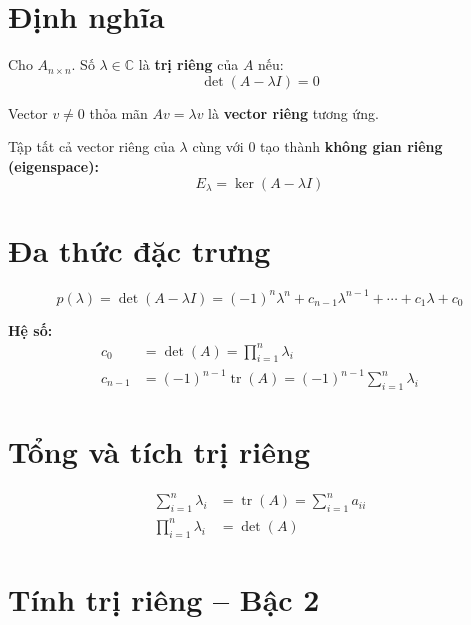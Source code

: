 
\section{Định nghĩa}

Cho $A_{n \times n}$. Số $\lambda \in \mathbb{C}$ là \textbf{trị riêng} của $A$ nếu:
\[
\det(A - \lambda I) = 0
\]

Vector $v \neq 0$ thỏa mãn $Av = \lambda v$ là \textbf{vector riêng} tương ứng.

Tập tất cả vector riêng của $\lambda$ cùng với $0$ tạo thành \textbf{không gian riêng (eigenspace):}
\[
E_\lambda = \ker(A - \lambda I)
\]

\section{Đa thức đặc trưng}

\[
p(\lambda) = \det(A - \lambda I) = (-1)^n \lambda^n + c_{n-1}\lambda^{n-1} + \cdots + c_1 \lambda + c_0
\]

\textbf{Hệ số:}
\begin{align}
c_0 &= \det(A) = \prod_{i=1}^n \lambda_i \\
c_{n-1} &= (-1)^{n-1} \operatorname{tr}(A) = (-1)^{n-1} \sum_{i=1}^n \lambda_i
\end{align}

\section{Tổng và tích trị riêng}

\begin{align}
\sum_{i=1}^n \lambda_i &= \operatorname{tr}(A) = \sum_{i=1}^n a_{ii} \\
\prod_{i=1}^n \lambda_i &= \det(A)
\end{align}

\section{Tính trị riêng -- Bậc 2}

